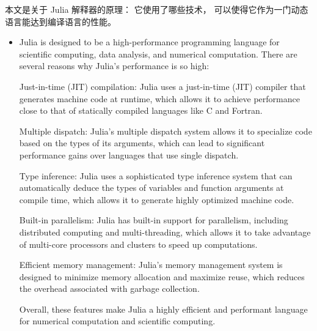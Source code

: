 
\begin{issues}
\issueDraft
\end{issues}

本文是关于 Julia 解释器的原理： 它使用了哪些技术， 可以使得它作为一门动态语言能达到编译语言的性能。

\begin{itemize}
\item Julia is designed to be a high-performance programming language for scientific computing, data analysis, and numerical computation. There are several reasons why Julia's performance is so high:

Just-in-time (JIT) compilation: Julia uses a just-in-time (JIT) compiler that generates machine code at runtime, which allows it to achieve performance close to that of statically compiled languages like C and Fortran.

Multiple dispatch: Julia's multiple dispatch system allows it to specialize code based on the types of its arguments, which can lead to significant performance gains over languages that use single dispatch.

Type inference: Julia uses a sophisticated type inference system that can automatically deduce the types of variables and function arguments at compile time, which allows it to generate highly optimized machine code.

Built-in parallelism: Julia has built-in support for parallelism, including distributed computing and multi-threading, which allows it to take advantage of multi-core processors and clusters to speed up computations.

Efficient memory management: Julia's memory management system is designed to minimize memory allocation and maximize reuse, which reduces the overhead associated with garbage collection.

Overall, these features make Julia a highly efficient and performant language for numerical computation and scientific computing.
\end{itemize}


